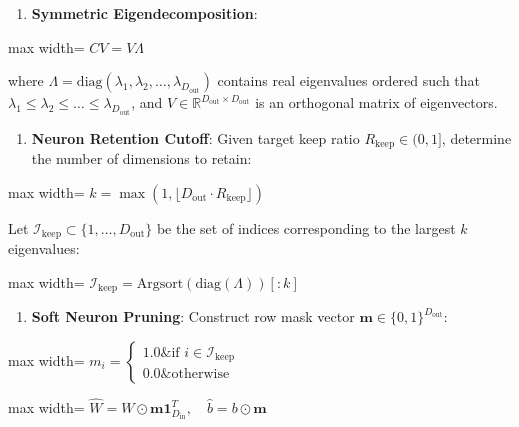 \begin{enumerate}
\item \textbf{Symmetric Eigendecomposition}:
\end{enumerate}
\begin{center}
\begin{adjustbox}{max width=\columnwidth}
$\displaystyle
C V = V \Lambda
$
\end{adjustbox}
\end{center}
where $\Lambda = \text{diag}(\lambda_1, \lambda_2, \dots, \lambda_{D_{\text{out}}})$ contains real eigenvalues ordered such that $\lambda_1 \le \lambda_2 \le \dots \le \lambda_{D_{\text{out}}}$, and $V \in \mathbb{R}^{D_{\text{out}} \times D_{\text{out}}}$ is an orthogonal matrix of eigenvectors.

\begin{enumerate}
\item \textbf{Neuron Retention Cutoff}:
Given target keep ratio $R_{\text{keep}} \in (0, 1]$, determine the number of dimensions to retain:
\end{enumerate}
\begin{center}
\begin{adjustbox}{max width=\columnwidth}
$\displaystyle
k = \max\left(1, \lfloor D_{\text{out}} \cdot R_{\text{keep}} \rfloor\right)
$
\end{adjustbox}
\end{center}
Let $\mathcal{I}_{\text{keep}} \subset \{1, \dots, D_{\text{out}}\}$ be the set of indices corresponding to the largest $k$ eigenvalues:
\begin{center}
\begin{adjustbox}{max width=\columnwidth}
$\displaystyle
\mathcal{I}_{\text{keep}} = \text{Argsort}(\text{diag}(\Lambda))[:k]
$
\end{adjustbox}
\end{center}

\begin{enumerate}
\item \textbf{Soft Neuron Pruning}:
Construct row mask vector $\mathbf{m} \in \{0, 1\}^{D_{\text{out}}}$:
\end{enumerate}
\begin{center}
\begin{adjustbox}{max width=\columnwidth}
$\displaystyle
m_i = \begin{cases} 1.0 \& \text{if } i \in \mathcal{I}_{\text{keep}} \\ 0.0 \& \text{otherwise} \end{cases}
$
\end{adjustbox}
\end{center}
\begin{center}
\begin{adjustbox}{max width=\columnwidth}
$\displaystyle
\widehat{W} = W \odot \mathbf{m} \mathbf{1}_{D_{\text{in}}}^T, \quad \widehat{b} = b \odot \mathbf{m}
$
\end{adjustbox}
\end{center}


